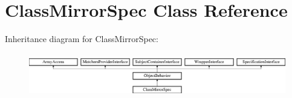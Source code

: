 \section{Class\+Mirror\+Spec Class Reference}
\label{classspec_1_1_prophecy_1_1_doubler_1_1_generator_1_1_class_mirror_spec}
Inheritance diagram for Class\+Mirror\+Spec\+:\begin{figure}[H]
\begin{center}
\leavevmode
\includegraphics[height=1.953488cm]{classspec_1_1_prophecy_1_1_doubler_1_1_generator_1_1_class_mirror_spec}
\end{center}
\end{figure}
